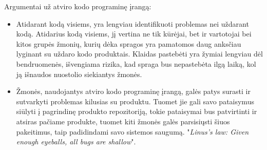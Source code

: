 \documentclass[a4paper,12pt,fleqn]{article}
\begin{document}
Argumentai už atviro kodo programinę įrangą:
\begin{itemize}
	\item Atidarant kodą visiems, yra lengviau identifikuoti problemas nei uždarant kodą. Atidarius kodą visiems, jį vertina ne tik kūrėjai, bet ir vartotojai bei kitos grupės žmonių, kurių dėka spragos yra pamatomos daug anksčiau lyginant su uždaro kodo produktais. Klaidas pastebėti yra žymiai lengviau dėl bendruomenės, išvengiama rizika, kad spraga bus nepastebėta ilgą laiką, kol ją išnaudos nuostolio siekiantys žmonės\cite{10.5555/580808}.
	\item Žmonės, naudojantys atviro kodo programinę įrangą, galės patys surasti ir sutvarkyti problemas kilusias su produktu. Tuomet jie gali savo pataisymus siūlyti į pagrindinę produkto repozitoriją, tokie pataisymai bus patvirtinti ir atsiras pačiame produkte, tuomet kiti žmonės galės parsisiųsti šiuos pakeitimus, taip padidindami savo sistemos saugumą. "\textit{Linus's law: Given enough eyeballs, all bugs are shallow}"\cite{Meneely:2009:SOS:1653662.1653717}.
\end{itemize}
\end{document}
